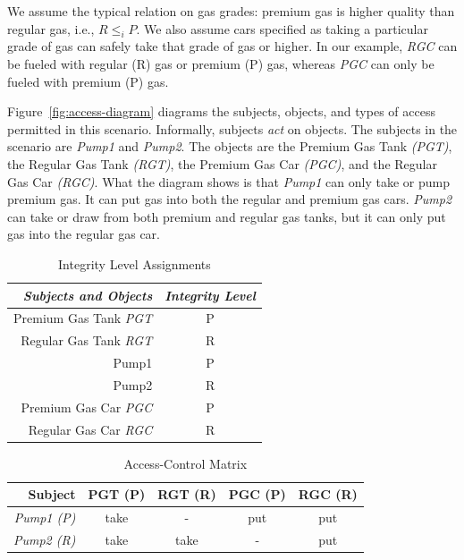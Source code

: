 We assume the typical relation on gas grades: premium gas is higher
quality than regular gas, i.e., $R \leq_i P$. We also assume cars
specified as taking a particular grade of gas can safely take that
grade of gas or higher. In our example, \emph{RGC} can be fueled with
regular (R) gas or premium (P) gas, whereas \emph{PGC} can only be
fueled with premium (P) gas.

Figure~\ref{fig:access-diagram} diagrams the subjects, objects, and
types of access permitted in this scenario. Informally, subjects
\emph{act} on objects. The subjects in the scenario are \emph{Pump1}
and \emph{Pump2}.  The objects are the Premium Gas Tank \emph{(PGT)},
the Regular Gas Tank \emph{(RGT)}, the Premium Gas Car \emph{(PGC)}, and
the Regular Gas Car \emph{(RGC)}. What the diagram shows is that
\emph{Pump1} can only take or pump premium gas.  It can put gas into
both the regular and premium gas cars.  \emph{Pump2} can take or draw
from both premium and regular gas tanks, but it can only put gas into
the regular gas car.

\begin{table}[t]
  \centering
\begin{tabular}[h]{r | c}
  \emph{Subjects and Objects} & \emph{Integrity Level}\\
  \hline
  Premium Gas Tank \emph{PGT} & P\\
  Regular Gas Tank \emph{RGT} & R\\
  Pump1  & P\\
  Pump2& R\\
  Premium Gas Car \emph{PGC} & P\\
  Regular Gas Car \emph{RGC} &R\\
\end{tabular}
  \caption{Integrity Level Assignments}
  \label{tab:int-level-assignments}
\end{table}

\begin{table}[t]
  \centering
  \begin{tabular}[h]{r | c c c c}
    \textbf{Subject} & \textbf{PGT (P)} & \textbf{RGT (R)} &
    \textbf{PGC (P)} &
    \textbf{RGC (R)}\\
    \hline
    \emph{Pump1 (P)} & take & - & put & put\\
    \emph{Pump2 (R)} & take & take & - & put\\
  \end{tabular}
  \caption{Access-Control Matrix}
  \label{tab:access-control-matrix}
\end{table}

